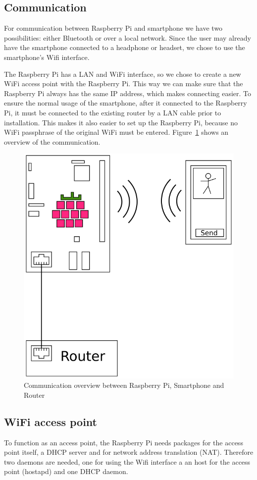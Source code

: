 \documentclass[conference]{IEEEtran}
\begin{document}
\subsection{Communication}
For communication between Raspberry Pi and smartphone we have two possibilities: either Bluetooth or over a local network. Since the user may already have the smartphone connected to a headphone or headset, we chose to use the smartphone's Wifi interface.

The Raspberry Pi has a LAN and WiFi interface, so we chose to create a new WiFi access point with the Raspberry Pi. This way we can make sure that the Raspberry Pi always has the same IP address, which makes connecting easier. To ensure the normal usage of the smartphone, after it connected to the Raspberry Pi, it must be connected to the existing router by a LAN cable prior to installation. This makes it also easier to set up the Raspberry Pi, because no WiFi passphrase of the original WiFi must be entered. Figure~\ref{FIG:COMMUNICATION} shows an overview of the communication.

\begin{figure}[ht]
\label{FIG:COMMUNICATION}
\centering
\includegraphics[width=0.75\linewidth]{pics/RasPi-MC}
\caption{Communication overview between Raspberry Pi, Smartphone and Router}
\end{figure}

\subsection{WiFi access point}
To function as an access point, the Raspberry Pi needs packages for the access point itself, a DHCP server and for network address translation (NAT). Therefore two daemons are needed, one for using the Wifi interface a an host for the access point (hostapd) and one DHCP daemon.
\end{document}
